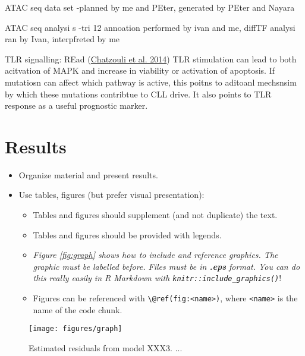 \documentclass[11pt, a4paper, twosided]{book}
\begin{document}
ATAC seq data set
-planned by me and PEter, generated by PEter and Nayara

ATAC seq analysi s
-tri 12 annoation performed by ivan and me, diffTF analysi ran by Ivan, interpfreted by me

TLR signalling:
REad (\protect\hyperlink{ref-Chatzouli2014}{Chatzouli et al. 2014})
TLR stimulation can lead to both acitvation of MAPK and increase in viability or activation of apoptosis. If mutatiosn can affect which pathway is active, this poitns to aditoanl mechsnsim by which these mutations contribtue to CLL drive. It also points to TLR response as a useful prognostic marker.

\hypertarget{results}{%
\chapter{Results}\label{results}}
\begin{itemize}
\item
  Organize material and present results.
\item
  Use tables, figures (but prefer visual presentation):
  \begin{itemize}
  \item
    Tables and figures should supplement (and not duplicate) the text.
  \item
    Tables and figures should be provided with legends.
  \item
    \emph{Figure \ref{fig:graph} shows how to include and reference graphics.
    The graphic must be labelled before. Files must be in \textbf{.eps} format. You
    can do this really easily in R Markdown with \texttt{knitr::include\_graphics()}}!
  \item
    Figures can be referenced with \texttt{\textbackslash{}@ref(fig:\textless{}name\textgreater{})}, where \texttt{\textless{}name\textgreater{}} is the
    name of the code chunk.
  \end{itemize}
\end{itemize}
\begin{figure}

{\centering \texttt{[image: figures/graph]} 

}

\caption{Estimated residuals from model XXX3. ...}\label{fig:graph3}
\end{figure}
\end{document}
